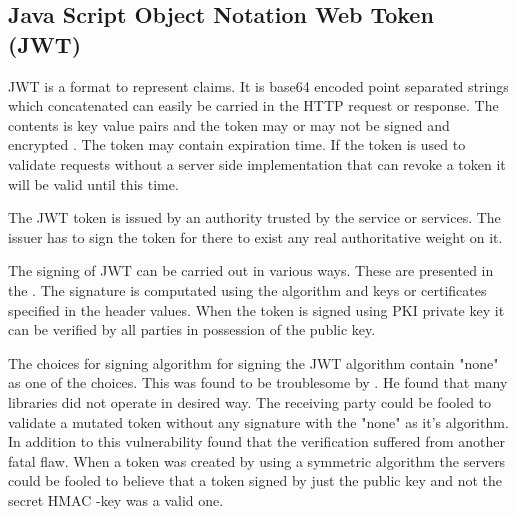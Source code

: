 \subsection{Java Script Object Notation Web Token (JWT)}
\begin{sloppypar}
    JWT is a format to represent claims. It is base64 encoded point separated 
    strings which concatenated can easily be carried in the HTTP request or 
    response. The contents is key value pairs and the token may or may not be 
    signed and encrypted \citep{RFC7519}. The token may contain expiration time. 
    If the token is used to validate requests without a server side implementation 
    that can revoke a token it will be valid until this time.
\end{sloppypar}
\begin{sloppypar}
    The JWT token is issued by an authority trusted by the service or services. 
    The issuer has to sign the token for there to exist any real authoritative 
    weight on it.
\end{sloppypar}
\begin{sloppypar}
    The signing of JWT can be carried out in various ways. These are presented 
    in the \citet{RFC7515}. The signature is computated using the algorithm and 
    keys or certificates specified in the header values. When the token is 
    signed using PKI private key it can be verified by all parties in 
    possession of the public key. 
\end{sloppypar}
\begin{sloppypar}
    The choices for signing algorithm for signing the JWT algorithm contain 
    "none" as one of the choices. This was found to be troublesome by 
    \citet{nonejwt}. He found that many libraries did not operate in desired 
    way. The receiving party could be fooled to validate a mutated token without
    any signature with the "none" as it's algorithm. In addition to this 
    vulnerability \citet{nonejwt} found that the verification suffered from 
    another fatal flaw. When a token was created by using a symmetric algorithm 
    the servers could be fooled to believe that a token signed by just the 
    public key and not the secret HMAC -key was a valid one.
\end{sloppypar}


